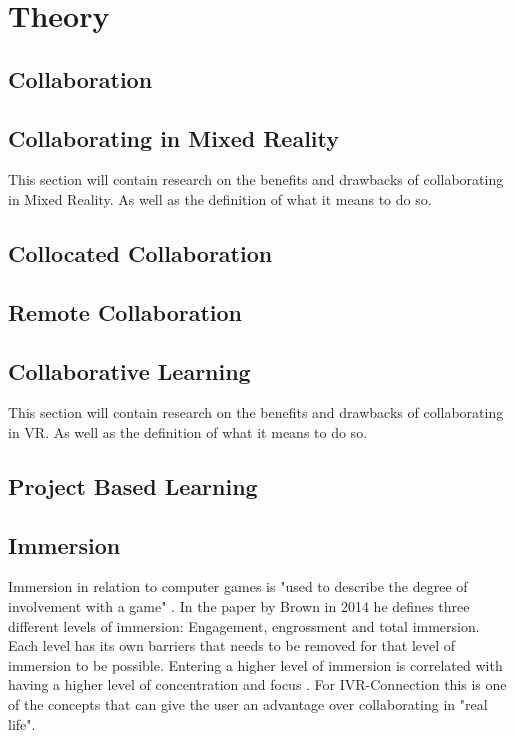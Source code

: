 \chapter{Theory}

    \section{Collaboration}

    \section{Collaborating in Mixed Reality}
    This section will contain research on the benefits and drawbacks of collaborating in Mixed Reality. As well as the definition of what it means to do so.
    
    \section{Collocated Collaboration}
    
    \section{Remote Collaboration}
    
    \section{Collaborative Learning} %
    This section will contain research on the benefits and drawbacks of collaborating in VR. As well as the definition of what it means to do so.
    
    \section{Project Based Learning}
    
    \section{Immersion} %
    Immersion in relation to computer games is "used to describe the degree of involvement with a game" \cite{Brown2004}. In the paper by Brown in 2014 he defines three different levels of immersion: Engagement, engrossment and total immersion. Each level has its own barriers that needs to be removed for that level of immersion to be possible. Entering a higher level of immersion is correlated with having a higher level of concentration and focus \cite{Jennett2008}. For IVR-Connection this is one of the concepts that can give the user an advantage over collaborating in "real life".
    
